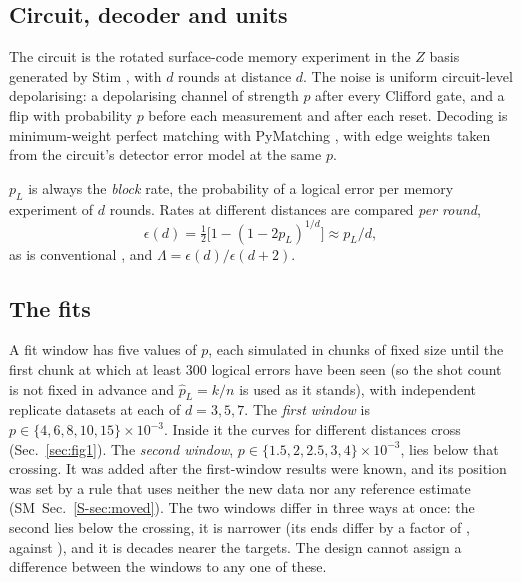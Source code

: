 \documentclass[aps,pre,twocolumn,superscriptaddress,nofootinbib,10pt]{revtex4-2}
\newcommand{\SM}{SM}
\newcommand{\pL}{p_L}
\begin{document}
\subsection{Circuit, decoder and units}\label{sec:units}
The circuit is the rotated surface-code memory experiment in the $Z$ basis generated by Stim \cite{stim2021}, with $d$ rounds at distance $d$. The noise is uniform circuit-level depolarising: a depolarising channel of strength $p$ after every Clifford gate, and a flip with probability $p$ before each measurement and after each reset. Decoding is minimum-weight perfect matching with PyMatching \cite{sparseblossom2025}, with edge weights taken from the circuit's detector error model at the same $p$.

$\pL$ is always the \emph{block} rate, the probability of a logical error per memory experiment of $d$ rounds. Rates at different distances are compared \emph{per round},
\begin{equation}
\epsilon(d)=\tfrac12\bigl[1-(1-2\pL)^{1/d}\bigr]\approx\pL/d ,\label{eq:perround}
\end{equation}
as is conventional \cite{google2023,google2025}, and $\Lambda=\epsilon(d)/\epsilon(d+2)$.

\subsection{The fits}\label{sec:recipes}
A fit window has five values of $p$, each simulated in chunks of fixed size until the first chunk at which at least 300 logical errors have been seen (so the shot count is not fixed in advance and $\hat\pL=k/n$ is used as it stands), with  independent replicate datasets at each of $d=3,5,7$. The \emph{first window} is $p\in\{4,6,8,10,15\}\times10^{-3}$. Inside it the curves for different distances cross (Sec.~\ref{sec:fig1}). The \emph{second window}, $p\in\{1.5,2,2.5,3,4\}\times10^{-3}$, lies below that crossing. It was added after the first-window results were known, and its position was set by a rule that uses neither the new data nor any reference estimate (\SM\ Sec.~\ref{S-sec:moved}). The two windows differ in three ways at once: the second lies below the crossing, it is narrower (its ends differ by a factor of , against ), and it is  decades nearer the targets. The design cannot assign a difference between the windows to any one of these.
\end{document}
